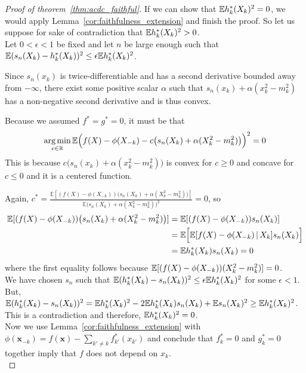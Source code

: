 \begin{proof}[Proof of theorem~\ref{thm:acdc_faithful}]
If we can show that ${\mathbb E} h^*_k(X_k)^2 = 0$, we would apply Lemma~\ref{cor:faithfulness_extension} and finish the proof. So let us suppose for sake of contradiction that ${\mathbb E} h^*_k(X_k)^2 > 0$.\\

Let $0 < \epsilon < 1$ be fixed and let $n$ be large enough such that ${\mathbb E}( s_n(X_k) - h^*_k(X_k))^2 \leq \epsilon {\mathbb E} h^*_k(X_k)^2 $.

Since $s_n(x_k)$ is twice-differentiable and has a second derivative bounded away from $-\infty$, there exist some positive scalar $\alpha$ such that $s_n(x_k) + \alpha(x_k^2 - m_k^2)$ has a non-negative second derivative and is thus convex. 

Because we assumed $f^* = g^* = 0$, it must be that
\[
\mathop{\text{\rm arg\,min}}_{c \in {\mathbb R}} 
{\mathbb E}\Big( f(X) - \phi(X_{-k}) - c\big( s_n(X_k) + \alpha(X_k^2 - m_k^2)\big) \Big)^2 = 0
\]
This is because $c\big( s_n(x_k) + \alpha(x_k^2 - m_k^2) \big)$ is convex for $c \geq 0$ and concave for $c \leq 0$ and it is a centered function.

Again, $c^* = \frac{\mathbb{E}[(f(X)-\phi(X_{-k}))\big( 
           s_n(X_k) + \alpha (X_k^2 - m_k^2) \big)]}{\mathbb{E}
       \big( s_n(X_k) + \alpha (X_k^2 - m_k^2) \big)^2} = 0$, so
\begin{align*}
\mathbb{E}[ (f(X)-\phi(X_{-k})) \big( s_n(X_k) + \alpha (X_k^2-m_k^2) \big) ] &= 
\mathbb{E}[ (f(X) - \phi(X_{-k})) s_n(X_k) ] \\
& = \mathbb{E}\Big[ \mathbb{E}[ f(X) - \phi(X_{-k}) {\,|\,} X_k]  s_n(X_k) \Big] \\
& = \mathbb{E} h^*_k(X_k) s_n(X_k)  = 0
\end{align*}
where the first equality follows because ${\mathbb E}[ (f(X) - \phi(X_{-k})) (X_k^2 - m_k^2)] = 0$. \\

We have chosen $s_n$ such that ${\mathbb E}(h^*_k(X_k) - s_n(X_k))^2 \leq \epsilon {\mathbb E} h^*_k(X_k)^2$ for some $\epsilon < 1$. But, ${\mathbb E} (h^*_k(X_k) - s_n(X_k))^2 = {\mathbb E} h^*_k(X_k)^2 - 2 {\mathbb E} h^*_k(X_k)s_n(X_k) + {\mathbb E} s_n(X_k)^2 \geq {\mathbb E} h^*_k(X_k)^2$. This is a contradiction and therefore, ${\mathbb E} h^*_k(X_k)^2 = 0$.\\

Now we use
Lemma~\ref{cor:faithfulness_extension} with $\phi(\mathbf{x}_{-k}) =
f(\mathbf{x}) - \sum_{k' \neq k} f^*_{k'} (x_{k'})$ and conclude that
$f^*_k = 0$ and $g^*_k = 0$ together imply that $f$ does not depend on $x_k$.\\


\end{proof}
